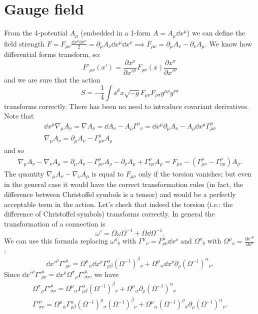 \documentclass[a4paper,12pt]{book}
\begin{document}
\section{Gauge field}
From the 4-potential $A_\mu$ (embedded in a 1-form $A=A_\mu\dd x^\mu$) we can define the field strength $F=F_{\mu\nu}\frac{\dd x^\mu\dd x^\nu}{2}=\partial_\mu A_\nu\dd x^\mu\dd x^\nu\implies F_{\mu\nu}=\partial_\mu A_\nu-\partial_\nu A_\mu$. We know how differential forms transform, so:
\[F'_{\mu\nu}(x')=\frac{\partial x^\rho}{\partial x'^\mu}F_{\rho\sigma}(x)\frac{\partial x^\sigma}{\partial x'^\nu}\]
and we are sure that the action
\[S=-\frac{1}{4}\int\dd^4x\sqrt{-g}F_{\mu\nu}F_{\rho\sigma}g^{\mu\rho}g^{\nu\sigma}\]
transforms correctly. There has been no need to introduce covariant derivatives. Note that
\begin{gather*}\dd x^\mu\nabla_\mu A_\nu=\nabla A_\nu=\dd A_\nu-A_\rho\Gamma^\rho{}_\nu=\dd x^\mu\partial_\mu A_\nu-A_\rho\dd x^\mu\Gamma_{\mu\nu}^\rho\\
\nabla_\mu A_\nu=\partial_\mu A_\nu-\Gamma_{\mu\nu}^\rho A_\rho
\end{gather*}
and so
\begin{gather*}
\nabla_\mu A_\nu-\nabla_\nu A_\mu=\partial_\mu A_\nu-\Gamma_{\mu\nu}^\rho A_\rho-\partial_\nu A_\mu+\Gamma_{\nu\mu}^\rho A_\rho=F_{\mu\nu}-(\Gamma_{\mu\nu}^\rho-\Gamma_{\nu\mu}^\rho)A_\rho.
\end{gather*}
The quantity $\nabla_\mu A_\nu-\nabla_\nu A_\mu$ is equal to $F_{\mu\nu}$ only if the torsion vanishes; but even in the general case it would have the correct transformation rules (in fact, the difference between Christoffel symbols is a tensor) and would be a perfectly acceptable term in the action. Let's check that indeed the torsion (i.e.: the difference of Christoffel symbols) transforms correctly. In general the transformation of a connection is
\[\omega'=\Omega\omega\Omega^{-1}+\Omega\dd\Omega^{-1}.\]
We can use this formula replacing $\omega^a{}_b$ with $\Gamma^\mu{}_\nu=\Gamma^\mu_{\rho\nu}\dd x^\rho$ and $\Omega^a{}_b$ with $\Omega^\mu{}_\nu=\frac{\partial x'^\mu}{\partial x^\nu}$:
\[\dd x'^\rho\Gamma'^\mu_{\rho\nu}=\Omega^\mu{}_\alpha\dd x^\rho\Gamma^\alpha_{\rho\beta}(\Omega^{-1})^\beta{}_\nu+\Omega^\mu{}_\alpha\dd x^\rho\partial_\rho(\Omega^{-1})^\alpha{}_\nu.\]
Since $\dd x'^\rho\Gamma'^\mu_{\rho\nu}=\dd x^\rho\Omega^\sigma{}_\rho\Gamma'^\mu_{\sigma\nu}$, we have
\begin{gather*}
\Omega^\sigma{}_\rho\Gamma'^\mu_{\sigma\nu}=\Omega^\mu{}_\alpha\Gamma^\alpha_{\rho\beta}(\Omega^{-1})^\beta{}_\nu+\Omega^\mu{}_\alpha\partial_\rho(\Omega^{-1})^\alpha{}_\nu\\
\Gamma'^\mu_{\sigma\nu}=\Omega^\mu{}_\alpha\Gamma^\alpha_{\rho\beta}(\Omega^{-1})^\rho{}_\sigma(\Omega^{-1})^\beta{}_\nu+\Omega^\mu{}_\alpha(\Omega^{-1})^\rho{}_\sigma\partial_\rho(\Omega^{-1})^\alpha{}_\nu.
\end{gather*}
\end{document}
